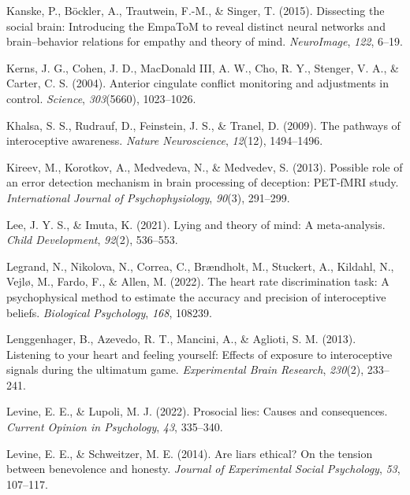 \documentclass[
  man,mask,floatsintext]{apa6}
\newlength{\cslhangindent}
\newlength{\cslentryspacingunit} %
\newenvironment{CSLReferences}[2] %
 {%
  \setlength{\parindent}{0pt}
  \ifodd #1
  \let\oldpar\par
  \def\par{\hangindent=\cslhangindent\oldpar}
  \fi
  \setlength{\parskip}{#2\cslentryspacingunit}
 }%
 {}
\begin{document}
\begin{CSLReferences}{1}{0}
\leavevmode{}%
Kanske, P., Böckler, A., Trautwein, F.-M., \& Singer, T. (2015). Dissecting the social brain: Introducing the EmpaToM to reveal distinct neural networks and brain--behavior relations for empathy and theory of mind. \emph{NeuroImage}, \emph{122}, 6--19.

\leavevmode{}%
Kerns, J. G., Cohen, J. D., MacDonald III, A. W., Cho, R. Y., Stenger, V. A., \& Carter, C. S. (2004). Anterior cingulate conflict monitoring and adjustments in control. \emph{Science}, \emph{303}(5660), 1023--1026.

\leavevmode{}%
Khalsa, S. S., Rudrauf, D., Feinstein, J. S., \& Tranel, D. (2009). The pathways of interoceptive awareness. \emph{Nature Neuroscience}, \emph{12}(12), 1494--1496.

\leavevmode{}%
Kireev, M., Korotkov, A., Medvedeva, N., \& Medvedev, S. (2013). Possible role of an error detection mechanism in brain processing of deception: PET-fMRI study. \emph{International Journal of Psychophysiology}, \emph{90}(3), 291--299.

\leavevmode{}%
Lee, J. Y. S., \& Imuta, K. (2021). Lying and theory of mind: A meta-analysis. \emph{Child Development}, \emph{92}(2), 536--553.

\leavevmode{}%
Legrand, N., Nikolova, N., Correa, C., Brændholt, M., Stuckert, A., Kildahl, N., Vejlø, M., Fardo, F., \& Allen, M. (2022). The heart rate discrimination task: A psychophysical method to estimate the accuracy and precision of interoceptive beliefs. \emph{Biological Psychology}, \emph{168}, 108239.

\leavevmode{}%
Lenggenhager, B., Azevedo, R. T., Mancini, A., \& Aglioti, S. M. (2013). Listening to your heart and feeling yourself: Effects of exposure to interoceptive signals during the ultimatum game. \emph{Experimental Brain Research}, \emph{230}(2), 233--241.

\leavevmode{}%
Levine, E. E., \& Lupoli, M. J. (2022). Prosocial lies: Causes and consequences. \emph{Current Opinion in Psychology}, \emph{43}, 335--340.

\leavevmode{}%
Levine, E. E., \& Schweitzer, M. E. (2014). Are liars ethical? On the tension between benevolence and honesty. \emph{Journal of Experimental Social Psychology}, \emph{53}, 107--117.


\end{CSLReferences}
\end{document}

